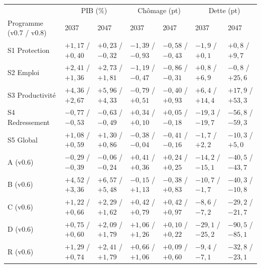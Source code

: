 \begin{tabular}{lllllll}\toprule & \multicolumn{2}{c}{PIB (\%)} & \multicolumn{2}{c}{Chômage (pt)} & \multicolumn{2}{c}{Dette (pt)}\\ Programme (v0.7 / v0.8) & 2037 & 2047 & 2037 & 2047 & 2037 & 2047\\ \midrule
S1 Protection & $+1{,}17$ / $+0{,}40$ & $+0{,}23$ / $-0{,}32$ & $-1{,}39$ / $-0{,}93$ & $-0{,}58$ / $-0{,}43$ & $-1{,}9$ / $+0{,}1$ & $+0{,}8$ / $+9{,}7$\\
S2 Emploi & $+2{,}41$ / $+1{,}36$ & $+2{,}73$ / $+1{,}81$ & $-1{,}19$ / $-0{,}47$ & $-0{,}86$ / $-0{,}31$ & $+0{,}8$ / $+6{,}9$ & $-0{,}8$ / $+25{,}6$\\
S3 Productivité & $+4{,}36$ / $+2{,}67$ & $+5{,}96$ / $+4{,}33$ & $-0{,}79$ / $+0{,}51$ & $-0{,}40$ / $+0{,}93$ & $+6{,}4$ / $+14{,}4$ & $+17{,}9$ / $+53{,}3$\\
S4 Redressement & $-0{,}77$ / $-0{,}53$ & $-0{,}63$ / $-0{,}49$ & $+0{,}34$ / $+0{,}10$ & $+0{,}05$ / $-0{,}18$ & $-19{,}3$ / $-19{,}7$ & $-56{,}8$ / $-59{,}3$\\
S5 Global & $+1{,}08$ / $+0{,}59$ & $+1{,}30$ / $+0{,}86$ & $-0{,}38$ / $-0{,}04$ & $-0{,}41$ / $-0{,}16$ & $-1{,}7$ / $+2{,}2$ & $-10{,}3$ / $+5{,}0$\\
A (v0.6) & $-0{,}29$ / $-0{,}39$ & $-0{,}06$ / $-0{,}24$ & $+0{,}41$ / $+0{,}36$ & $+0{,}24$ / $+0{,}25$ & $-14{,}2$ / $-15{,}1$ & $-40{,}5$ / $-43{,}7$\\
B (v0.6) & $+4{,}52$ / $+3{,}36$ & $+6{,}57$ / $+5{,}48$ & $-0{,}15$ / $+1{,}13$ & $-0{,}38$ / $+0{,}83$ & $-10{,}7$ / $-1{,}7$ & $-40{,}3$ / $-10{,}8$\\
C (v0.6) & $+1{,}22$ / $+0{,}66$ & $+2{,}29$ / $+1{,}62$ & $+0{,}42$ / $+0{,}79$ & $+0{,}42$ / $+0{,}97$ & $-8{,}6$ / $-7{,}2$ & $-29{,}2$ / $-21{,}7$\\
D (v0.6) & $+0{,}75$ / $+0{,}60$ & $+2{,}09$ / $+1{,}79$ & $+1{,}06$ / $+1{,}26$ & $+0{,}10$ / $+0{,}22$ & $-29{,}1$ / $-25{,}2$ & $-90{,}5$ / $-85{,}1$\\
R (v0.6) & $+1{,}29$ / $+0{,}74$ & $+2{,}41$ / $+1{,}79$ & $+0{,}66$ / $+1{,}06$ & $+0{,}09$ / $+0{,}60$ & $-9{,}4$ / $-7{,}1$ & $-32{,}8$ / $-23{,}1$\\\bottomrule\end{tabular}